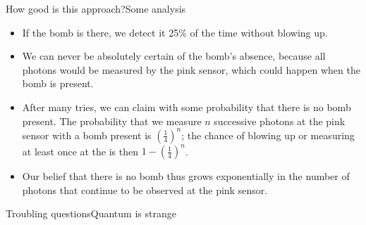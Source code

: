 \begin{frame}{How good is this approach?}{Some analysis}

\begin{itemize}
    \item If the bomb is there, we detect it 25\% of the time without blowing up.
    \item We can never be absolutely certain of the bomb's absence, because all photons would be measured by the \textcolor{\RCone}{pink sensor}, which could happen when the bomb is present.
    \item After many tries, we can claim with some probability that there is no bomb present.  The probability that we measure $n$ successive photons at the \textcolor{\RCone}{pink sensor} with a bomb present is $\left(\frac{1}{4}\right)^{n}$;  the chance of blowing up or measuring at least once at the  is then $1-{(\frac{1}{4})}^{n}$.
    \item Our belief that there is no bomb thus grows exponentially in the number of photons that continue to be observed at the \textcolor{\RCone}{pink sensor}.
\end{itemize}
    
\end{frame}

\begin{frame}{Troubling questions}{Quantum is strange}
\end{frame}



